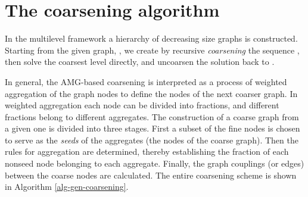 \documentclass[final]{siamltex}
\begin{document}
\section{The coarsening algorithm}\label{algorithm}
\par In the multilevel framework a hierarchy of decreasing size graphs
 is constructed. Starting from the given graph,
, we create by recursive {\it coarsening} the sequence ,
then solve the coarsest level directly, and uncoarsen the
solution back to .
\par In general, the AMG-based coarsening is interpreted as a process
of weighted aggregation of the graph nodes to define the nodes of
the next coarser graph. In weighted aggregation each node can be
divided into fractions, and different fractions belong to
different aggregates. The construction of a coarse graph from a
given one is divided into three stages. First a subset of the fine
nodes is chosen to serve as the {\it seeds} of the aggregates (the
nodes of the coarse graph). Then the rules for aggregation are
determined, thereby establishing the fraction of each nonseed
node belonging to each aggregate. Finally, the graph couplings
(or edges) between the coarse nodes are calculated. The entire
coarsening scheme is shown in Algorithm \ref{alg-gen-coarsening}.
\end{document}
